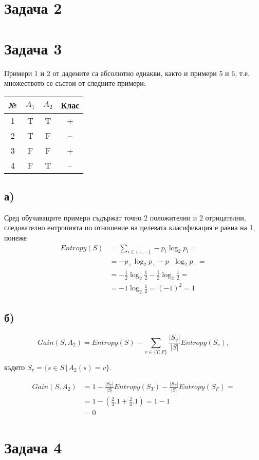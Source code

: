 \documentclass{article}
\begin{document}
\section*{Задача 2}

\section*{Задача 3}

Примери 1 и 2  от дадените са абсолютно еднакви, както и примери 5 и 6, т.е. множеството се състои от следните примери:

\begin{center}
\begin{tabular}{ |c|c|c|c| }
    \hline
    № & \(A_1\) & \(A_2\) & Клас \\
    \hline
    1 & T & T & + \\
    2 & T & F & -- \\
    3 & F & F & + \\
    4 & F & T & -- \\
    \hline
\end{tabular}
\end{center}

\subsection*{а)}

Сред обучаващите примери съдържат точно 2 положителни и 2 отрицателни,
следователно ентропията по отношение на целевата класификация е равна на 1, понеже
\begin{align*}
    Entropy(S) &= \sum_{i \in \{+, -\}} -p_i \log_2 p_i = \\
      &= -p_+ \log_2 p_+ - p_- \log_2 p_- = \\
      &= -\frac{1}{2} \log_2 \frac{1}{2} - \frac{1}{2} \log_2 \frac{1}{2} = \\
      &= -1 \log_2 \frac{1}{2} = (-1)^2 = 1
\end{align*}

\subsection*{б)}

\[
    Gain(S, A_2) = Entropy(S) - \sum_{v \in \{T, F\}} \frac{|S_v|}{|S|} Entropy(S_v),
\]

където \( S_v = \{ s \in S \, | \, A_2(s) = v \} \).

\begin{align*}
    Gain(S, A_2) &= 1 - \frac{|S_T|}{|S|} Entropy(S_T) - \frac{|S_F|}{|S|} Entropy(S_F) = \\
      &= 1 - \left(\frac{2}{4} . 1 + \frac{2}{4} . 1\right) = 1 - 1 \\
      &= 0
\end{align*}

\section*{Задача 4}
\end{document}

